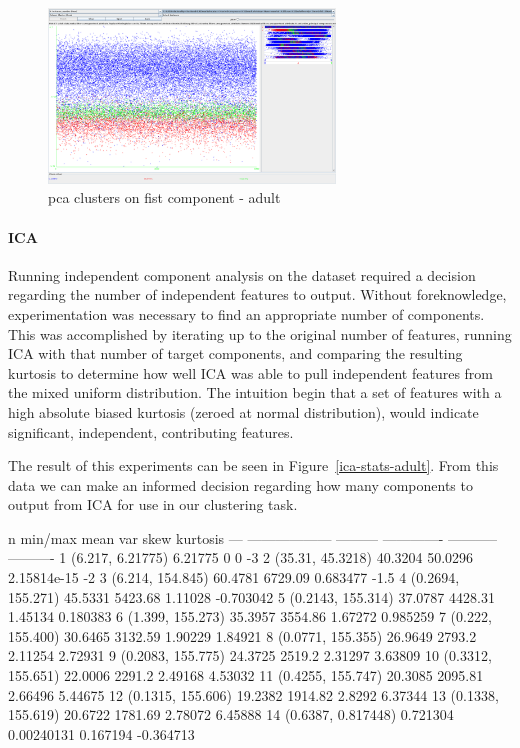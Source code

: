 \documentclass{sig-alternate}
\begin{document}
\begin{figure}[!htbp]
    \centering
    \includegraphics[width=3in]{part2/adult/pca-cluster-scatter.pdf}
    \caption{pca clusters on fist component - adult\label{pca-cluster-scatter}}
\end{figure} 


\paragraph{ICA}

Running independent component analysis on the dataset required a decision regarding the number of independent features to output. Without foreknowledge, experimentation was necessary to find an appropriate number of components. This was accomplished by iterating up to the original number of features, running ICA with that number of target components, and comparing the resulting kurtosis to determine how well ICA was able to pull independent features from the mixed uniform distribution. The intuition begin that a set of features with a high absolute biased kurtosis (zeroed at normal distribution), would indicate significant, independent, contributing features.

The result of this experiments can be seen in Figure~\ref{ica-stats-adult}. From this data we can make an informed decision regarding how many components to output from ICA for use in our clustering task. 

\tiny
\begin{verbbox}
  n  min/max                  mean            var         skew    kurtosis
---  ------------------  ---------  -------------  -----------  ----------
  1  (6.217, 6.21775)     6.21775      0           0             -3
  2  (35.31, 45.3218)    40.3204      50.0296      2.15814e-15   -2
  3  (6.214, 154.845)    60.4781    6729.09        0.683477      -1.5
  4  (0.2694, 155.271)   45.5331    5423.68        1.11028       -0.703042
  5  (0.2143, 155.314)   37.0787    4428.31        1.45134        0.180383
  6  (1.399, 155.273)    35.3957    3554.86        1.67272        0.985259
  7  (0.222, 155.400)    30.6465    3132.59        1.90229        1.84921
  8  (0.0771, 155.355)   26.9649    2793.2         2.11254        2.72931
  9  (0.2083, 155.775)   24.3725    2519.2         2.31297        3.63809
 10  (0.3312, 155.651)   22.0006    2291.2         2.49168        4.53032
 11  (0.4255, 155.747)   20.3085    2095.81        2.66496        5.44675
 12  (0.1315, 155.606)   19.2382    1914.82        2.8292         6.37344
 13  (0.1338, 155.619)   20.6722    1781.69        2.78072        6.45888
 14  (0.6387, 0.817448)   0.721304     0.00240131  0.167194      -0.364713
\end{verbbox}
\normalsize
\end{document}

